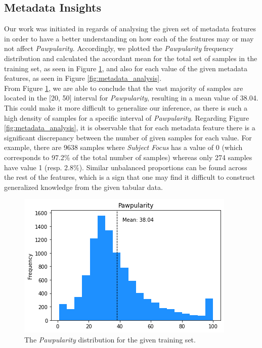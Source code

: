 \documentclass{article}
\begin{document}
\subsection{Metadata Insights}
Our work was initiated in  regards of analysing the given set of metadata features in order to have a better understanding on how each of the features may or may not affect \textit{Pawpularity}. Accordingly, we plotted the \textit{Pawpularity} frequency distribution and calculated the accordant mean for the total set of samples in the training set, as seen in Figure \ref{fig:pawpularity_distribution}, and also for each value of the given metadata features, as seen in Figure \ref{fig:metadata_analysis}.\\
From Figure \ref{fig:pawpularity_distribution}, we are able to conclude that the vast majority of samples are located in the [20, 50] interval for \textit{Pawpularity}, resulting in a mean value of 38.04. This could make it more difficult to generalize our inference, as there is such a high density of samples for a specific interval of \textit{Pawpularity}. Regarding Figure \ref{fig:metadata_analysis}, it is observable that for each metadata feature there is a significant discrepancy between the number of given samples for each value. For example, there are 9638 samples where \textit{Subject Focus} has a value of $0$ (which corresponds to 97.2\% of the total number of samples) whereas only 274 samples have value 1 (resp. 2.8\%). Similar unbalanced proportions can be found across the rest of the features, which is a sign that one may find it difficult to construct generalized knowledge from the given tabular data.

\begin{figure}[h!]
    \centering
    \includegraphics[width=0.65\linewidth]{figs/pawpularity_distribution.png}
    \caption{The \textit{Pawpularity} distribution for the given training set.}
    \label{fig:pawpularity_distribution}
\end{figure}
\vspace{0.5cm}
\end{document}

